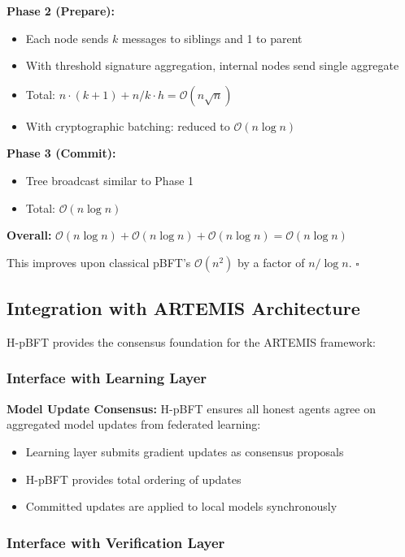 \documentclass[conference]{IEEEtran}
\newcommand{\bigO}{\mathcal{O}}
\begin{document}
\textbf{Phase 2 (Prepare):}
\begin{itemize}
    \item Each node sends $k$ messages to siblings and 1 to parent
    \item With threshold signature aggregation, internal nodes send single aggregate
    \item Total: $n \cdot (k+1) + n/k \cdot h = \bigO(n\sqrt{n})$
    \item With cryptographic batching: reduced to $\bigO(n \log n)$
\end{itemize}

\textbf{Phase 3 (Commit):}
\begin{itemize}
    \item Tree broadcast similar to Phase 1
    \item Total: $\bigO(n \log n)$
\end{itemize}

\textbf{Overall:} $\bigO(n \log n) + \bigO(n \log n) + \bigO(n \log n) = \bigO(n \log n)$

This improves upon classical pBFT's $\bigO(n^2)$ by a factor of $n/\log n$. $\square$

\subsection{Integration with ARTEMIS Architecture}

H-pBFT provides the consensus foundation for the ARTEMIS framework:

\subsubsection{Interface with Learning Layer}

\textbf{Model Update Consensus:} H-pBFT ensures all honest agents agree on aggregated model updates from federated learning:
\begin{itemize}
    \item Learning layer submits gradient updates as consensus proposals
    \item H-pBFT provides total ordering of updates
    \item Committed updates are applied to local models synchronously
\end{itemize}

\subsubsection{Interface with Verification Layer}
\end{document}

